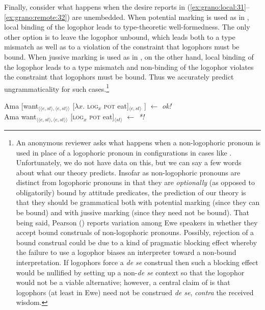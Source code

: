 \documentclass[output=paper,modfonts,nonflat]{langsci/langscibook}
\begin{document}
Finally, consider what happens when the desire reports in (\ref{ex:grano:local:31}--\ref{ex:grano:remote:32}) are unembedded. When potential marking is used as in , local binding of the logophor leads to type-theoretic well-formedness. The only other option is to leave the logophor unbound, which leads both to a type mismatch as well as to a violation of the constraint that logophors must be bound. When jussive marking is used as in , on the other hand, local binding of the logophor leads to a type mismatch and non-binding of the logophor violates the constraint that logophors must be bound. Thus we accurately predict ungrammaticality for such cases.\footnote{An anonymous reviewer asks what happens when a non-logophoric pronoun is used in place of a logophoric pronoun in configurations in cases like . Unfortunately, we do not have data on this, but we can say a few words about what our theory predicts. Insofar as non-logophoric pronouns are distinct from logophoric pronouns in that they are \emph{optionally} (as opposed to obligatorily) bound by attitude predicates, the prediction of our theory is that they should be grammatical both with potential marking (since they can be bound) and with jussive marking (since they need not be bound). That being said, Pearson (\citeyear[97]{Pearson2015}) reports variation among Ewe speakers in whether they accept bound construals of non-logophoric pronouns. Possibly, rejection of a bound construal could be due to a kind of pragmatic blocking effect whereby the failure to use a logophor biases an interpreter toward a non-bound interpretation. If logophors force a \emph{de se} construal then such a blocking effect would be nullified by setting up a non-\emph{de se} context so that the logophor would not be a viable alternative; however, a central claim of \cite{Pearson2015} is that logophors (at least in Ewe) need not be construed \emph{de se}, \emph{contra} the received wisdom.}



\ea \label{ex:grano:local':33}
    \begin{xlist}
    \ex Ama [want$_{\langle\langle e,st\rangle,\langle e,st\rangle\rangle}$ [$\lambda x$. \textsc{log}$_{x}$ \textsc{pot} eat]$_{\langle e,st\rangle}$ ] \hfill $\leftarrow$ \emph{ok!}\\
    \ex Ama want$_{\langle\langle e,st\rangle,\langle e,st\rangle\rangle}$ [\textsc{log}$_{x}$ \textsc{pot} eat]$_{\langle st\rangle}$  \hfill $\leftarrow$ \emph{*!} 
    \end{xlist}
\z
\end{document}
